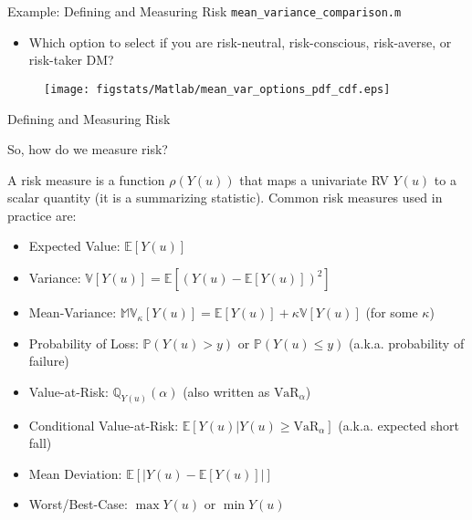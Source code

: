 \documentclass[handout,9pt]{beamer}
\begin{document}
%
\begin{frame}{Example: Defining and Measuring Risk \footnotesize{\texttt{mean\_variance\_comparison.m}}}
\begin{itemize}
\item Which option to select if you are risk-neutral, risk-conscious, risk-averse, or risk-taker DM?
\end{itemize}
\begin{figure}[!htb]
    \centering
	\texttt{[image: figstats/Matlab/mean\_var\_options\_pdf\_cdf.eps]}
\end{figure}

\end{frame}

%
\begin{frame}{Defining and Measuring Risk}
\begin{block}{}
So, how do we measure risk? 
\end{block}

A risk measure is a function $\rho(Y(u))$ that maps a univariate RV $Y(u)$ to a scalar quantity (it is a summarizing statistic). Common risk measures used in practice are:
\begin{itemize}
   \setlength{\itemsep}{10pt}
\item Expected Value: $\mathbb{E}[Y(u)]$
\item Variance: $\mathbb{V}[Y(u)]=\mathbb{E}[(Y(u)-\mathbb{E}[Y(u)])^2]$
\item Mean-Variance: $\mathbb{MV}_\kappa[Y(u)]=\mathbb{E}[Y(u)]+\kappa \mathbb{V}[Y(u)]$ (for some $\kappa$)
\item Probability of Loss: $\mathbb{P}(Y(u)>y)$ or $\mathbb{P}(Y(u)\leq y)$ (a.k.a. probability of failure)
\item Value-at-Risk: $\mathbb{Q}_{Y(u)}(\alpha)$ (also written as $\textrm{VaR}_\alpha$)
\item Conditional Value-at-Risk: $\mathbb{E}[Y(u)|Y(u)\geq \textrm{VaR}_\alpha]$ (a.k.a. expected short fall) 
\item Mean Deviation:  $\mathbb{E}[|Y(u)-\mathbb{E}[Y(u)]|]$
\item Worst/Best-Case: $\max Y(u)$ or $\min Y(u)$
\end{itemize}

\end{frame}
\end{document}
